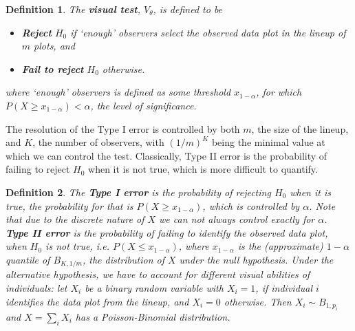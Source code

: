 \documentclass{article}
\newcommand{\red}[1]{{\color{red} #1}} %
\newtheorem{dfn}{Definition}[section]
\begin{document}
\begin{dfn}\label{dfn:test}
The \textbf{visual test}, $V_{\theta}$, is defined to be 
\begin{itemize}\itemsep-3pt
\item \textbf{Reject} $H_0$ if `enough' observers select the observed data plot in the lineup of $m$ plots, and
\item \textbf{Fail to reject} $H_0$  otherwise. %
\end{itemize}
where `enough' observers is defined as some threshold $x_{1-\alpha}$, for which $P(X \ge x_{1-\alpha}) < \alpha$, the level of significance.
\end{dfn}

The resolution of the Type I error is controlled by both $m$, the size of the lineup, and $K$, the number of observers, with $(1/m)^K$ being the minimal value at which we can control the test. 
Classically, Type II error is the probability of failing to reject $H_0$ when it is not true, which is more difficult to quantify. 

\begin{dfn}\label{dfn:error}
The \textbf{Type I error} is the probability of \red{rejecting $H_0$ when it is true, the probability for that is $P(X \ge x_{1-\alpha})$, which is controlled by $\alpha$. Note that due to the discrete nature of $X$ we can not always control exactly for $\alpha$. }
\textbf{Type II error} is the probability of failing to identify the observed data plot, when $H_0$ is not true, \red{i.e. $P( X \le x_{1-\alpha})$, where $x_{1 - \alpha}$ is the (approximate) $1-\alpha$ quantile of  $B_{K, 1/m}$, the distribution of $X$ under the null hypothesis.}
\red{Under the alternative hypothesis, we have to account for different visual abilities of  individuals: let $X_i$ be a binary random variable with $X_i = 1$, if individual $i$ identifies the data plot from the lineup, and $X_i = 0$ otherwise.  Then $X_i \sim B_{1, p_i}$ and $X = \sum_i X_i$ has  a Poisson-Binomial distribution.}
\end{dfn}


\end{document}
